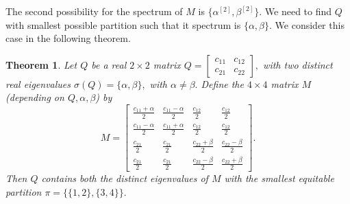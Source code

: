 \documentclass[12pt,twoside]{article}
\newtheorem{theorem}{Theorem}[section]
\begin{document}
The second possibility for the spectrum of $M$ is $\{\alpha^{[2]},\beta^{[2]}\}.$ We need to find $Q$ with smallest possible partition such that it spectrum is $\{\alpha,\beta\}.$ We consider this case in the following theorem.
\begin{theorem}\label{thm:4x4-two-eigs}
	Let $Q$ be a real $2\times 2$ matrix $Q=
	\begin{bmatrix}
		c_{11} & c_{12}\\
		c_{21} & c_{22}
	\end{bmatrix},$ 	with two distinct real eigenvalues $\sigma(Q)=\{\alpha,\beta\},$ with $ \alpha\neq\beta.$
	Define the $4\times 4$ matrix $M$ (depending on $Q,\alpha,\beta$) by
	\begin{equation}\label{eq:M-4x4}
		M=
		\begin{bmatrix}
			\displaystyle \frac{c_{11}+\alpha}{2} & \displaystyle \frac{c_{11}-\alpha}{2} & \displaystyle \frac{c_{12}}{2} & \displaystyle \frac{c_{12}}{2}\\
			\displaystyle \frac{c_{11}-\alpha}{2} & \displaystyle \frac{c_{11}+\alpha}{2} & \displaystyle \frac{c_{12}}{2} & \displaystyle \frac{c_{12}}{2}\\
			\displaystyle \frac{c_{21}}{2} & \displaystyle \frac{c_{21}}{2} & \displaystyle \frac{c_{22}+\beta}{2} & \displaystyle \frac{c_{22}-\beta}{2}\\
			\displaystyle \frac{c_{21}}{2} & \displaystyle \frac{c_{21}}{2} & \displaystyle \frac{c_{22}-\beta}{2} & \displaystyle \frac{c_{22}+\beta}{2}
		\end{bmatrix}.
	\end{equation}
	Then $Q$ contains both the distinct eigenvalues of $M$ with the smallest equitable partition  $\pi=\bigl\{\{1,2\},\{3,4\}\bigr\}.$
\end{theorem}
\end{document}
